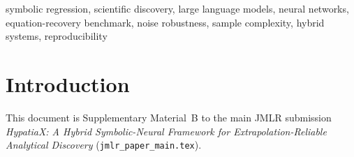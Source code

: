 \documentclass[twoside,11pt]{article}
\begin{document}
\begin{keywords}
symbolic regression, scientific discovery, large language models,
neural networks, equation-recovery benchmark, noise robustness, sample complexity,
hybrid systems, reproducibility
\end{keywords}

\section{Introduction}
\label{suppb:intro}

This document is Supplementary Material~B to the main JMLR submission
\emph{HypatiaX: A Hybrid Symbolic-Neural Framework for Extrapolation-Reliable
Analytical Discovery} (\texttt{jmlr\_paper\_main.tex}).
\end{document}
